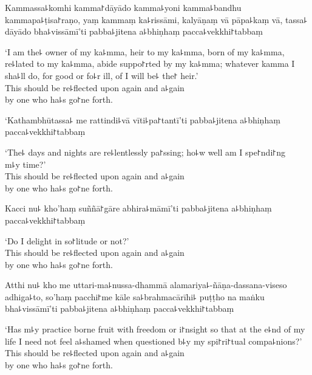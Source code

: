 Kammassa꜕komhi kamma꜓dāyādo kamma꜕yoni kamma꜕bandhu kammapa꜕ṭisa꜓raṇo, yaṃ kammaṃ ka꜕rissāmi, kalyāṇaṃ vā pāpa꜕kaṃ vā, tassa꜕ dāyādo bha꜕vissāmī'ti pabba꜕jitena a꜕bhiṇhaṃ pacca꜕vekkhi꜓tabbaṃ

\begin{english}
  `I am the꜕ owner of my ka꜕mma, heir to my ka꜕mma, born of my ka꜕mma,\\
  re꜕lated to my ka꜕mma, abide suppo꜓rted by my ka꜕mma; whatever kamma I sha꜕ll do, for good or fo꜕r ill, of  I will be꜕ the꜓ heir.'\\
  This should be re꜕flected upon again and a꜕gain\\
  by one who ha꜕s go꜓ne forth.
\end{english}

\clearpage

`Kathambhūtassa꜕ me rattindi꜕vā vīti꜕pa꜓tantī'ti pabba꜕jitena a꜕bhiṇhaṃ pacca꜕vekkhi꜓tabbaṃ

\begin{english}
  `The꜕ days and nights are re꜕lentlessly pa꜓ssing; ho꜕w well am I spe꜓ndi꜓ng\\ m꜕y time?'\\
  This should be re꜕flected upon again and a꜕gain\\
  by one who ha꜕s go꜓ne forth.
\end{english}

Kacci nu꜕ kho'haṃ suññā꜓gāre abhira꜕māmī'ti pabba꜕jitena a꜕bhiṇhaṃ pacca꜕vekkhi꜓tabbaṃ

\begin{english}
  `Do I delight in so꜓litude or not?'\\
  This should be re꜕flected upon again and a꜕gain\\
  by one who ha꜕s go꜓ne forth.
\end{english}

Atthi nu꜕ kho me uttari-ma꜕nussa-dhammā alamariya꜕-ñāṇa-dassana-viseso adhiga꜕to, so'haṃ pacchi꜓me kāle sa꜕brahmacārīhi꜕ puṭṭho na maṅku bha꜕vissāmī'ti pabba꜕jitena a꜕bhiṇhaṃ pacca꜕vekkhi꜓tabbaṃ

\begin{english}
  `Has m꜕y practice borne fruit with freedom or i꜓nsight so that at the e꜕nd of my life I need not feel a꜕shamed when questioned b꜕y my spi꜓ri꜓tual compa꜕nions?'\\
  This should be re꜕flected upon again and a꜕gain\\
  by one who ha꜕s go꜓ne forth.
\end{english}

